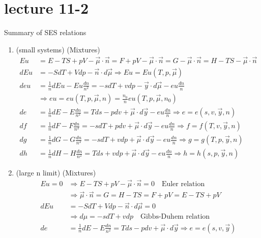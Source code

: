 \section{lecture 11-2}
\begin{thm}
    Summary of SES relations
    \begin{enumerate}
        \item (small systems) (Mixtures)
        \begin{align*}
            Eu &= E - TS + pV - \vec{\mu}\cdot \vec{n} = F + pV - \vec{\mu}\cdot \vec{n} = G - \vec{\mu}\cdot \vec{n} = H - TS - \vec{\mu}\cdot \vec{n} \\
            dEu &= -S dT + V dp - \vec{n}\cdot d\vec{\mu} \Rightarrow Eu = Eu(T, p, \vec{\mu}) \\
            deu &= \frac{1}{n} dEu - Eu \frac{dn}{n^2} = -s dT + v dp - \vec{y} \cdot d\vec{\mu} - eu \frac{dn}{n}\\
             &\Rightarrow eu = eu(T, p, \vec{\mu}, n) = \frac{n_0}{n} eu(T, p, \vec{\mu}, n_0) \\
            de &= \frac{1}{n} dE - E \frac{dn}{n^2} = T ds - p dv + \vec{\mu} \cdot d\vec{y} - eu \frac{dn}{n} \Rightarrow e = e(s, v, \vec{y}, n) \\
            df &= \frac{1}{n} dF - F \frac{dn}{n^2} = -s dT + p dv + \vec{\mu} \cdot d\vec{y} - eu \frac{dn}{n} \Rightarrow f = f(T, v, \vec{y}, n) \\
            dg &= \frac{1}{n} dG - G \frac{dn}{n^2} = -s dT + v dp + \vec{\mu} \cdot d\vec{y} - eu \frac{dn}{n} \Rightarrow g = g(T, p, \vec{y}, n) \\
            dh &= \frac{1}{n} dH - H \frac{dn}{n^2} = T ds + v dp + \vec{\mu} \cdot d\vec{y} - eu \frac{dn}{n} \Rightarrow h = h(s, p, \vec{y}, n)
        \end{align*}
        \item (large n limit) (Mixtures)
        \begin{align*}
            Eu = 0  &\Rightarrow  E - TS + pV - \vec{\mu}\cdot \vec{n} = 0 \quad \boxed{\text{Euler relation}} \\
        &\Rightarrow  \vec{\mu}\cdot \vec{n} = G = H - TS = F + pV = E - TS + pV \\
        dEu &= -S dT + Vdp - \vec{n}\cdot  d\vec{\mu} = 0 \\
        &\Rightarrow  d\mu = -s dT + vdp \quad \boxed{\text{Gibbs-Duhem relation}} \\
        de &= \frac{1}{n} dE - E \frac{dn}{n^2} = T ds - p dv + \vec{\mu} \cdot d\vec{y}  \Rightarrow e = e(s, v, \vec{y}) \\

\end{align*}
\end{enumerate}
\end{thm}
